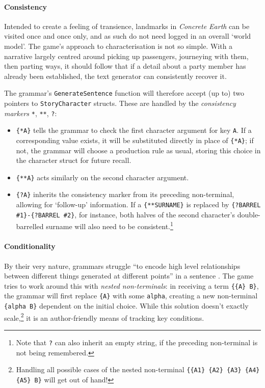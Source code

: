 \documentclass[a4paper, 11pt]{article}
\begin{document}
\begin{flushleft}
\paragraph{Consistency} Intended to create a feeling of transience, landmarks in \textit{Concrete Earth} can be visited once and once only, and as such do not need logged in an overall `world model'. The game's approach to characterisation is not so simple. With a narrative largely centred around picking up passengers, journeying with them, then parting ways, it should follow that if a detail about a party member has already been established, the text generator can consistently recover it. %

\vspace{5pt}\noindent
The grammar's \texttt{GenerateSentence} function will therefore accept (up to) two pointers to \texttt{StoryCharacter} structs. These are handled by the \textit{consistency markers} \verb|*|, \verb|**|, \verb|?|: %
\begin{itemize}[noitemsep]
\item \verb|{*A}| tells the grammar to check the first character argument for key \verb|A|. If a corresponding value exists, it will be substituted directly in place of \verb|{*A}|; if not, the grammar will choose a production rule as usual, storing this choice in the character struct for future recall.
\item \verb|{**A}| acts similarly on the second character argument.
\item \verb|{?A}| inherits the consistency marker from its preceding non-terminal, allowing for `follow-up' information. If a \verb|{**SURNAME}| is replaced by \verb|{?BARREL #1}-{?BARREL #2}|, for instance, both halves of the second character's double-barrelled surname will also need to be consistent.\footnote{Note that \texttt{?} can also inherit an empty string, if the preceding non-terminal is not being remembered.}
\end{itemize}


\paragraph{Conditionality} By their very nature, grammars struggle ``to encode high level relationships between different things generated at different points'' in a sentence \citep{cmptn19}. The game tries to work around this with \textit{nested non-terminals}: in receiving a term \verb|{{A} B}|, the grammar will first replace \verb|{A}| with some \verb|alpha|, creating a new non-terminal \verb|{alpha B}| dependent on the initial choice. While this solution doesn't exactly scale,\footnote{Handling all possible cases of the nested non-terminal \texttt{\{\{A1\} \{A2\} \{A3\} \{A4\} \{A5\} B\}} will get out of hand!} it is an author-friendly means of tracking key conditions.


\end{flushleft}
\end{document}
